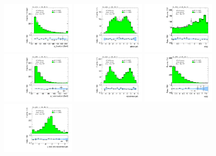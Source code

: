 \begin{figure}[tp]
  \includegraphics[width=0.32\textwidth]{figures/analysis/vbf-MCXSR/jet-1-pt}
  \includegraphics[width=0.32\textwidth]{figures/analysis/vbf-MCXSR/jet-1-eta}
  \includegraphics[width=0.32\textwidth]{figures/analysis/vbf-MCXSR/jets-dphi}
  \includegraphics[width=0.32\textwidth]{figures/analysis/vbf-MCXSR/jet-2-pt}
  \includegraphics[width=0.32\textwidth]{figures/analysis/vbf-MCXSR/jet-2-eta}
  \includegraphics[width=0.32\textwidth]{figures/analysis/vbf-MCXSR/jets-deta}
  \includegraphics[width=0.32\textwidth]{figures/analysis/vbf-MCXSR/jets-etaprod}

\end{figure}
